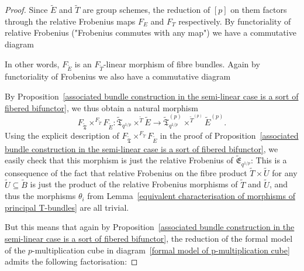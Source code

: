 \documentclass[10pt,oneside]{amsart}
\theoremstyle{definition}
\begin{document}
\begin{proof}
	Since $\tilde{E}$ and $\tilde{T}$ are group schemes, the reduction of $[p]$ on them factors through the relative Frobenius maps $F_E$ and $F_T$ respectively. By functoriality of relative Frobenius ("Frobenius commutes with any map") we have a commutative diagram
	\begin{center}
	\end{center}
	In other words, $F_{\tilde E}$ is an $F_{\tilde T}$-linear morphism of fibre bundles. Again by functoriality of Frobenius we also have a commutative diagram
	\begin{center}
	\end{center}
	
	By Proposition~\ref{associated bundle construction in the semi-linear case is a sort of fibered bifunctor}, we thus obtain a natural morphism
	\[F_{\tilde{\mathfrak{T}}}\times^{F_{\tilde{T}}} F_{\tilde
		E}:\tilde{\mathfrak T}_{q^{1/p}}\times^{\tilde T}\tilde E \rightarrow \tilde{\mathfrak T}_{q^{1/p}}^{(p)}\times^{\tilde T^{(p)}}\tilde E^{(p)}. \]
	Using the explicit description of $F_{\tilde{\mathfrak{T}}}\times^{F_{\tilde{T}}} F_{\tilde
		E}$ in the proof of Proposition~\ref{associated bundle construction in the semi-linear case is a sort of fibered bifunctor}, we easily check that this morphism is just the relative Frobenius of $\tilde{\mathfrak{E}}_{q^{1/p}}$: This is a consequence of the fact that relative Frobenius on the fibre product $\tilde{T}\times \tilde{U}$ for any $\tilde{U}\subseteq \tilde{B}$ is just the product of the relative Frobenius morphisms of $\tilde T$ and $\tilde U$, and thus the morphisms $\theta_i$ from Lemma~\ref{equivalent characterisation of morphisms of principal T-bundles} are all trivial. 
	
	But this means that again by Proposition~\ref{associated bundle construction in the semi-linear case is a sort of fibered bifunctor}, the reduction of the formal model of the $p$-multiplication cube in diagram~\ref{formal model of p-multiplication cube} admits the following factorisation:
	

\end{proof}
\end{document}
